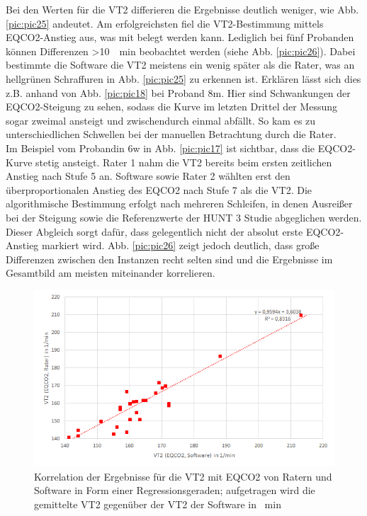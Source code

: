Bei den Werten für die VT2 differieren die Ergebnisse deutlich weniger, wie Abb. \ref{pic:pic25} andeutet. Am erfolgreichsten fiel die VT2-Bestimmung mittels \acs{EQCO2}-Anstieg aus, was mit  belegt werden kann. Lediglich bei fünf Probanden können Differenzen >\SI{10}{\per\minute} beobachtet werden (siehe Abb. \ref{pic:pic26}). Dabei bestimmte die Software die VT2 meistens ein wenig später als die Rater, was an hellgrünen Schraffuren in Abb. \ref{pic:pic25} zu erkennen ist. Erklären lässt sich dies z.B. anhand von Abb. \ref{pic:pic18} bei Proband 8m. Hier sind Schwankungen der \acs{EQCO2}-Steigung zu sehen, sodass die Kurve im letzten Drittel der Messung sogar zweimal ansteigt und zwischendurch einmal abfällt. So kam es zu unterschiedlichen Schwellen bei der manuellen Betrachtung durch die Rater.\\
Im Beispiel vom Probandin 6w in Abb. \ref{pic:pic17} ist sichtbar, dass die \acs{EQCO2}-Kurve stetig ansteigt. Rater 1 nahm die VT2 bereits beim ersten zeitlichen Anstieg nach Stufe 5 an. Software sowie Rater 2 wählten erst den überproportionalen Anstieg des \acs{EQCO2} nach Stufe 7 als die VT2. Die algorithmische Bestimmung erfolgt nach mehreren Schleifen, in denen Ausreißer bei der Steigung sowie die Referenzwerte der HUNT 3 Studie abgeglichen werden. Dieser Abgleich sorgt dafür, dass gelegentlich nicht der absolut erste \acs{EQCO2}-Anstieg markiert wird. Abb. \ref{pic:pic26} zeigt jedoch deutlich, dass große Differenzen zwischen den Instanzen recht selten sind und die Ergebnisse im Gesamtbild am meisten miteinander korrelieren.

\begin{figure}[H]
	\centering
	\includegraphics[scale=0.7]{Bilder/r_eqco2}
	\caption[Korrelation der \acs{EQCO2}-Ergebnisse von Ratern und Software]{Korrelation der Ergebnisse für die VT2 mit \acs{EQCO2} von Ratern und Software in Form einer Regressionsgeraden; aufgetragen wird die gemittelte VT2 gegenüber der VT2 der Software in \si{\per\minute}}
	\label{pic:pic28}
\end{figure}

